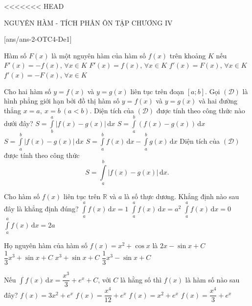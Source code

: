 <<<<<<< HEAD
\begin{name}
	{NGUYÊN HÀM - TÍCH PHÂN}
	{ÔN TẬP CHƯƠNG IV}
	{\tentruong}
	{\thoigian}
\end{name}
\setcounter{ex}{0}\setcounter{bt}{0}
[ans/ans-2-OTC4-De1]
\caulc
\begin{ex}%
	Hàm số $F(x)$ là một nguyên hàm của hàm số $f(x)$ trên khoảng $K$ nếu
	\choice
	{$F'(x)=-f(x),\,\forall x \in K$}
	{\True $F'(x)=f(x),\,\forall x \in K$}
	{$f'(x)=F(x),\,\forall x \in K$}
	{$f'(x)=-F(x),\,\forall x \in K$}
\end{ex}
\begin{ex}%
	Cho hai hàm số $y=f(x)$ và $y=g(x)$ liên tục trên đoạn $[a;b]$. Gọi $(\mathscr{D})$ là hình phẳng giới hạn bởi đồ thị hàm số $y=f(x)$ và $y=g(x)$ và hai đường thẳng $x=a,~x=b~(a<b)$. Diện tích của $(\mathscr{D})$ được tính theo công thức nào dưới đây?
	\choice
	{$S=\displaystyle\int\limits_b^a \left| f(x)-g(x)\right|\mathrm{\,d}x$}
	{$S=\displaystyle\int\limits_a^b \left(f(x)-g(x)\right)\mathrm{\,d}x$}
	{\True $S=\displaystyle\int\limits_a^b \left| f(x)-g(x)\right|\mathrm{\,d}x$}
	{$S=\displaystyle\int\limits_a^b f(x)\mathrm{\,d}x-\displaystyle\int\limits_a^b g(x)\mathrm{\,d}x$}
	\loigiai
	{
	Diện tích của $(\mathscr{D})$ được tính theo công thức
	\[S=\displaystyle\int\limits_a^b \left| f(x)-g(x)\right|\mathrm{\,d}x.\]
	}
\end{ex}
\begin{ex}%
	Cho hàm số $f(x)$ liên tục trên $\mathbb{R}$ và $a$ là số thực dương. Khẳng định nào sau đây là khẳng định đúng?
	\choice
	{$\displaystyle\int\limits_a^a f(x) \mathrm{\,d}x=1$}
	{$\displaystyle\int\limits_a^af(x) \mathrm{\,d}x=a^2$}
	{\True $\displaystyle\int\limits_a^af(x) \mathrm{\,d}x=0$}
	{$\displaystyle\int\limits_a^a f(x) \mathrm{\,d}x=2a$}
\end{ex}
\begin{ex}%
	Họ nguyên hàm của hàm số $f(x) = x^2+\cos x$ là
	\choice
	{$2x-\sin x+C$}
	{\True $\dfrac{1}{3}x^3+\sin x+C$}
	{$x^3+\sin x+C$}
	{$\dfrac{1}{3}x^3-\sin x+C$}
\end{ex}
\begin{ex}%
	Nếu $\displaystyle\int f(x) \mathrm{\,d}x=\dfrac{x^3}{3}+e^x+C$, với $C$ là hằng số thì $ f(x) $ là hàm số nào sau đây?
	\choice
	{$f(x)=3x^2+e^x$}
	{$f(x)=\dfrac{x^4}{12}+e^x$}
	{\True $f(x)=x^2+e^x$}
	{$f(x)=\dfrac{x^4}{3}+e^x$}
\end{ex}
